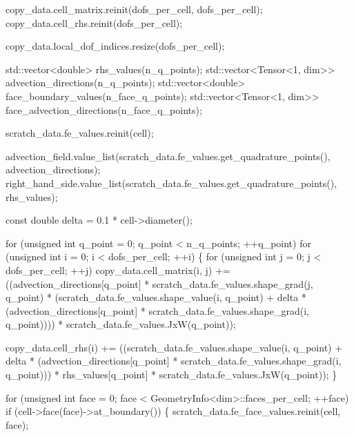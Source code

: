 \begin{DoxyCodeInclude}
    copy\_data.cell\_matrix.reinit(dofs\_per\_cell, dofs\_per\_cell);
    copy\_data.cell\_rhs.reinit(dofs\_per\_cell);

    copy\_data.local\_dof\_indices.resize(dofs\_per\_cell);

    std::vector<double> rhs\_values(n\_q\_points);
    std::vector<Tensor<1, dim>> advection\_directions(n\_q\_points);
    std::vector<double> face\_boundary\_values(n\_face\_q\_points);
    std::vector<Tensor<1, dim>> face\_advection\_directions(n\_face\_q\_points);


    scratch\_data.fe\_values.reinit(cell);

    advection\_field.value\_list(scratch\_data.fe\_values.get\_quadrature\_points(),
                               advection\_directions);
    right\_hand\_side.value\_list(scratch\_data.fe\_values.get\_quadrature\_points(),
                               rhs\_values);

    \textcolor{keyword}{const} \textcolor{keywordtype}{double} delta = 0.1 * cell->diameter();

    \textcolor{keywordflow}{for} (\textcolor{keywordtype}{unsigned} \textcolor{keywordtype}{int} q\_point = 0; q\_point < n\_q\_points; ++q\_point)
        \textcolor{keywordflow}{for} (\textcolor{keywordtype}{unsigned} \textcolor{keywordtype}{int} i = 0; i < dofs\_per\_cell; ++i) \{
            \textcolor{keywordflow}{for} (\textcolor{keywordtype}{unsigned} \textcolor{keywordtype}{int} j = 0; j < dofs\_per\_cell; ++j)
                copy\_data.cell\_matrix(i, j) +=
                    ((advection\_directions[q\_point] *
                      scratch\_data.fe\_values.shape\_grad(j, q\_point) *
                      (scratch\_data.fe\_values.shape\_value(i, q\_point) +
                       delta *
                           (advection\_directions[q\_point] *
                            scratch\_data.fe\_values.shape\_grad(i, q\_point)))) *
                     scratch\_data.fe\_values.JxW(q\_point));

            copy\_data.cell\_rhs(i) +=
                ((scratch\_data.fe\_values.shape\_value(i, q\_point) +
                  delta * (advection\_directions[q\_point] *
                           scratch\_data.fe\_values.shape\_grad(i, q\_point))) *
                 rhs\_values[q\_point] * scratch\_data.fe\_values.JxW(q\_point));
        \}

    \textcolor{keywordflow}{for} (\textcolor{keywordtype}{unsigned} \textcolor{keywordtype}{int} face = 0; face < GeometryInfo<dim>::faces\_per\_cell;
         ++face)
        \textcolor{keywordflow}{if} (cell->face(face)->at\_boundary()) \{
            scratch\_data.fe\_face\_values.reinit(cell, face);


\end{DoxyCodeInclude}
